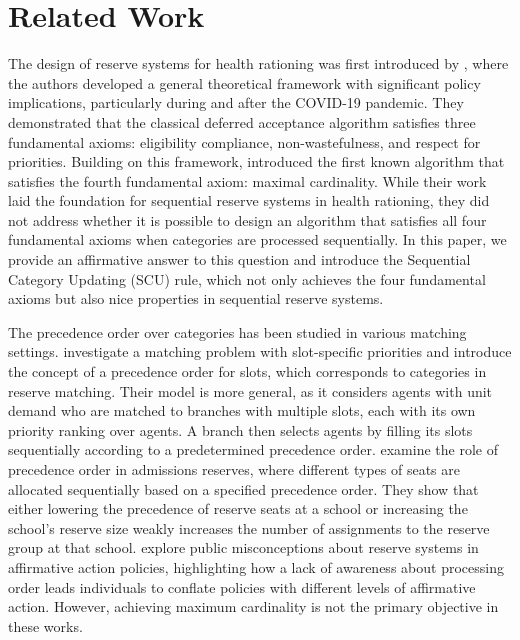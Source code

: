 \section{Related Work}
\label{section:literature}

The design of reserve systems for health rationing was first introduced by \citep{PSUY21a, PSUY24a}, where the authors developed a general theoretical framework with significant policy implications, particularly during and after the COVID-19 pandemic. They demonstrated that the classical deferred acceptance algorithm satisfies three fundamental axioms: eligibility compliance, non-wastefulness, and respect for priorities. Building on this framework, \citep{AzBr21a, AzBr24a} introduced the first known algorithm that satisfies the fourth fundamental axiom: maximal cardinality. While their work laid the foundation for sequential reserve systems in health rationing, they did not address whether it is possible to design an algorithm that satisfies all four fundamental axioms when categories are processed sequentially. In this paper, we provide an affirmative answer to this question and introduce the Sequential Category Updating (SCU) rule, which not only achieves the four fundamental axioms but also nice properties in sequential reserve systems.

The precedence order over categories has been studied in various matching settings.  
\citet{KoSo16a} investigate a matching problem with slot-specific priorities and introduce the concept of a precedence order for slots, which corresponds to categories in reserve matching. Their model is more general, as it considers agents with unit demand who are matched to branches with multiple slots, each with its own priority ranking over agents. A branch then selects agents by filling its slots sequentially according to a predetermined precedence order.  
%
\citet{DKPS18a} examine the role of precedence order in admissions reserves, where different types of seats are allocated sequentially based on a specified precedence order. They show that either lowering the precedence of reserve seats at a school or increasing the school's reserve size weakly increases the number of assignments to the reserve group at that school. 
%
\citet{PRS23a} explore public misconceptions about reserve systems in affirmative action policies, highlighting how a lack of awareness about processing order leads individuals to conflate policies with different levels of affirmative action.  
%
However, achieving maximum cardinality is not the primary objective in these works.  



